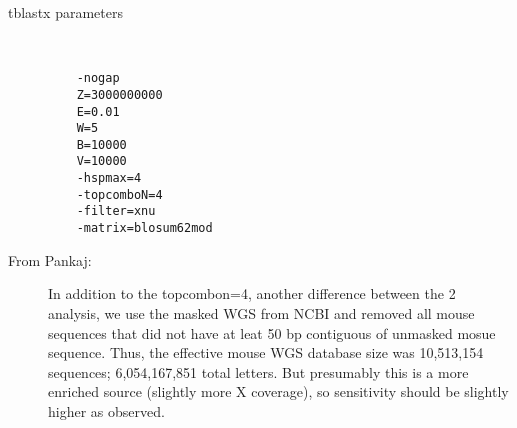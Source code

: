 \documentclass[11pt]{article}
\def\nwendcode{\endtrivlist \endgroup} %
\let\nwdocspar=\par                    %
\begin{document}
\begin{comment}
\nwenddocs{}\nwbegincode{18}\sublabel{NWHum17-BASM.2-2}\nwmargintag{{\nwtagstyle{}\subpageref{NWHum17-BASM.2-2}}}\moddef{BASH commands ANALYSIS~{\nwtagstyle{}\subpageref{NWHum17-BASM.2-1}}}\plusendmoddef
#
# Preparing files for Jim Kent
ODIR="$ANALYSIS/blast/wublast.tblastx" ;
# EXP="tbx_chr22" ; # < $ANALYSIS/blast/wublast.tblastx/masked3X+/gff/chr22.hsp.old
EXP="tbx_chr22_3X+" ;
ChckDirs $ODIR/$EXP ;
perl -ane '($F[8]=$F[9])=~ s/[";]//og; 
           print STDOUT (join("\\t",@F[0 .. 8]))."\\n";
          ' $ANALYSIS/blast/wublast.tblastx/masked3X+/gff/chr22 \\
          > $ODIR/$EXP/chr22.hsp ;
# cp $ANALYSIS/sgp/Hsap.masked.3X+/sr/chr22 $ODIR/chr22.sr ;
cp $ANALYSIS/sgp/Hsap.masked.3X+.fix/sr/chr22 $ODIR/$EXP/chr22.sr ;
gawk 'BEGIN\{n="#\\n## Filtered from chr22.sr - Score Cutoff: <26\\n#"\}
      $6>=26 \{print $0\}
      $0 ~ /^#/ \{
         if ($2=="Created") \{$0=$0"\\n"n\};
         print $0;
      \}' $ODIR/$EXP/chr22.sr > $ODIR/$EXP/chr22.sr-rs ;
pushd $ODIR ;
star $EXP.tar.gz $EXP ; # move to ftp dir...
popd ;
#
\nwendcode{}\nwbegindocs{19}\nwdocspar
\end{comment}

\begin{description}
\item[tblastx parameters] \ \\ %
\begin{verbatim}
    -nogap
    Z=3000000000
    E=0.01
    W=5
    B=10000
    V=10000
    -hspmax=4
    -topcomboN=4
    -filter=xnu
    -matrix=blosum62mod
\end{verbatim}
\nwenddocs{}%
%
%
%
%
%
%
%
%
%
%
%
%
%
%
%
%
%
%
%
%
%
%
%
\nwdocspar

\item[From Pankaj:]
In addition to the topcombon=4, another difference between the 2 analysis, we use the masked WGS from NCBI and removed all mouse sequences that did not have at leat 50 bp contiguous of unmasked mosue sequence. Thus, the effective mouse WGS database size was 10,513,154 sequences; 6,054,167,851 total letters. But presumably this is a more enriched source (slightly more X coverage), so sensitivity should be slightly higher as observed.
\end{description}
\end{document}

